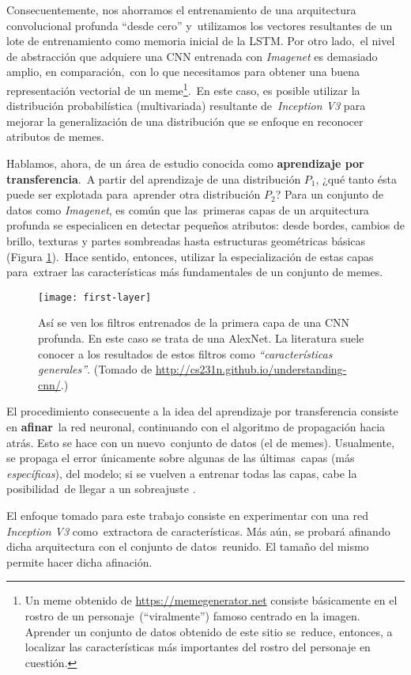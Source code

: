 Consecuentemente, nos ahorramos el entrenamiento de una arquitectura convolucional profunda ``desde cero'' y\
utilizamos los vectores resultantes de un lote de entrenamiento como memoria inicial de la LSTM. Por otro lado,\
el nivel de abstracción que adquiere una CNN entrenada con \emph{Imagenet} es demasiado amplio, en comparación,\
con lo que necesitamos para obtener una buena representación vectorial de un meme\footnote{
  Un meme obtenido de \url{https://memegenerator.net} consiste básicamente en el rostro de un personaje\
  (``viralmente'') famoso centrado en la imagen. Aprender un conjunto de datos obtenido de este sitio se\
  reduce, entonces, a localizar las características más importantes del rostro del personaje en cuestión.
}.\
En este caso, es posible utilizar la distribución probabilística (multivariada) resultante de\
\emph{Inception V3} para mejorar la generalización de una distribución que se enfoque en reconocer atributos de memes.\par
Hablamos, ahora, de un área de estudio conocida como \textbf{aprendizaje por transferencia}.\
A partir del aprendizaje de una distribución $P_1$, ¿qué tanto ésta puede ser explotada para\
aprender otra distribución $P_2$? Para un conjunto de datos como \emph{Imagenet}, es común que las\
primeras capas de un arquitectura profunda se especialicen en detectar pequeños atributos: desde bordes,
cambios de brillo, texturas y partes sombreadas hasta estructuras geométricas básicas (Figura \ref{first-layer}).\
Hace sentido, entonces, utilizar la especialización de estas capas para\
extraer las características más fundamentales de un conjunto de memes.

\begin{figure}[H]
  \centering
  \texttt{[image: first-layer]}
  \caption{
    Así se ven los filtros entrenados de la primera capa de una CNN profunda.
    En este caso se trata de una AlexNet. La literatura suele conocer a los resultados de estos
    filtros como \emph{``características generales''}.
    (Tomado de \url{http://cs231n.github.io/understanding-cnn/}.)}
  \label{first-layer}
\end{figure}

El procedimiento consecuente a la idea del aprendizaje por transferencia consiste en \textbf{afinar}\
la red neuronal, continuando con el algoritmo de propagación hacia atrás. Esto se hace con un nuevo\
conjunto de datos (el de memes). Usualmente, se propaga el error únicamente sobre algunas de las últimas\
capas (más \emph{específicas}), del modelo; si se vuelven a entrenar todas las capas, cabe la posibilidad\
de llegar a un sobreajuste \cite{DBLP:journals/corr/YosinskiCBL14}.\par
El enfoque tomado para este trabajo consiste en experimentar con una red \emph{Inception V3} como\
extractora de características. Más aún, se probará afinando dicha arquitectura con el conjunto de datos\
reunido. El tamaño del mismo permite hacer dicha afinación.

